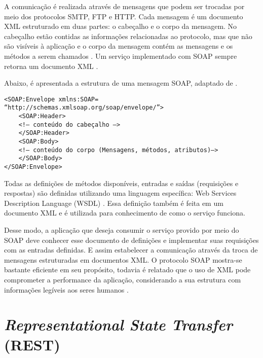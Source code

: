 A comunicação é realizada através de mensagens que podem ser trocadas por meio dos protocolos SMTP, FTP e HTTP. 
Cada mensagem é um documento XML estruturado em duas partes: o cabeçalho e o corpo da mensagem. No cabeçalho
estão contidas as informações relacionadas ao protocolo, mas que não são visíveis à aplicação e o corpo da mensagem  
contém as mensagens e os métodos a serem chamados \cite{mumbaikar, unraveling_soap, soap_and_ws}. 
Um serviço implementado com SOAP sempre retorna um documento XML \cite{wagh2012comparative}.

Abaixo, é apresentada a estrutura de uma mensagem SOAP, adaptado de . 

\lstset{language=XML}
\begin{lstlisting}
<SOAP:Envelope xmlns:SOAP= “http://schemas.xmlsoap.org/soap/envelope/”>
    <SOAP:Header>
    <!— conteúdo do cabeçalho —>
    </SOAP:Header>
    <SOAP:Body>
    <!— conteúdo do corpo (Mensagens, métodos, atributos)—>
    </SOAP:Body>
</SOAP:Envelope> 
\end{lstlisting}

Todas as definições de métodos disponíveis, entradas e saídas (requisições e respostas) são definidas utilizando uma linguagem específica: Web Services Description Language (WSDL) \cite{soap_and_ws}. Essa definição também é feita em um documento XML e é utilizada para conhecimento de como o serviço funciona.

Desse modo, a aplicação que deseja consumir o serviço provido por meio do SOAP deve conhecer esse documento de definições e implementar suas requisições com as entradas
definidas. E assim estabelecer a comunicação através da troca de mensagens estruturadas em documentos XML. O protocolo SOAP mostra-se bastante eficiente em seu propósito, todavia é relatado que o uso de XML pode comprometer a performance da aplicação, considerando a sua estrutura com informações legíveis aos seres humanos \cite{wagh2012comparative, soap_and_ws}.


\section{\textit{Representational State Transfer} (REST) }

